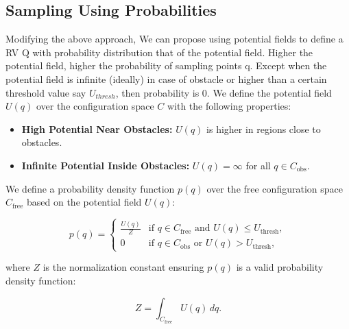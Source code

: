 \documentclass[11pt]{article}
\begin{document}
\subsection*{Sampling Using Probabilities}
Modifying the above approach, We can propose using potential fields to define a RV Q with probability distribution that of the potential field.
Higher the potential field, higher the probability of sampling points q. Except when the potential field is infinite (ideally) in case of obstacle or higher than a certain threshold value say $U_{thresh}$, then probability is 0. 
\newline
\newline
We define the potential field \( U(q) \) over the configuration space \( C \) with the following properties:
\begin{itemize}
    \item \textbf{High Potential Near Obstacles:} \( U(q) \) is higher in regions close to obstacles.
    \item \textbf{Infinite Potential Inside Obstacles:} \( U(q) = \infty \) for all \( q \in C_{\text{obs}} \).
\end{itemize}

We define a probability density function \( p(q) \) over the free configuration space \( C_{\text{free}} \) based on the potential field \( U(q) \):

\[
p(q) =
\begin{cases} 
    \frac{U(q)}{Z} & \text{if } q \in C_{\text{free}} \text{ and } U(q) \leq U_{\text{thresh}}, \\
    0 & \text{if } q \in C_{\text{obs}} \text{ or } U(q) > U_{\text{thresh}},
\end{cases}
\]

where \( Z \) is the normalization constant ensuring \( p(q) \) is a valid probability density function:

\[
Z = \int_{C_{\text{free}}} U(q) \, dq.
\]





\end{document}
